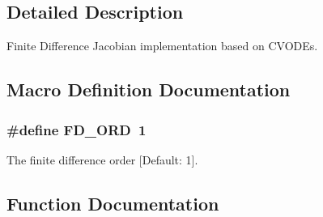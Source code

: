 \subsection{Detailed Description}
Finite Difference Jacobian implementation based on C\+V\+O\+D\+Es. 



\subsection{Macro Definition Documentation}
\subsubsection[{\texorpdfstring{F\+D\+\_\+\+O\+RD}{FD_ORD}}]{\setlength{\rightskip}{0pt plus 5cm}\#define F\+D\+\_\+\+O\+RD~1}\hypertarget{fd__jacob_8cu_a5c00ed5d35f84424a9e4b2197bf21ac7}{}\label{fd__jacob_8cu_a5c00ed5d35f84424a9e4b2197bf21ac7}


The finite difference order \mbox{[}Default\+: 1\mbox{]}. 



\subsection{Function Documentation}
